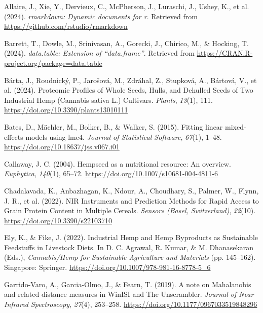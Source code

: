 \documentclass[
]{agujournal2019}
\newlength{\cslhangindent}
\newenvironment{CSLReferences}[2] %
 {\begin{list}{}{%
  \setlength{\itemindent}{0pt}
  \setlength{\leftmargin}{0pt}
  \setlength{\parsep}{0pt}
  \ifodd #1
   \setlength{\leftmargin}{\cslhangindent}
   \setlength{\itemindent}{-1\cslhangindent}
  \fi
  \setlength{\itemsep}{#2\baselineskip}}}
 {\end{list}}
\begin{document}
\label{refs}
\begin{CSLReferences}{1}{0}
\vspace{1em}

Allaire, J., Xie, Y., Dervieux, C., McPherson, J., Luraschi, J., Ushey,
K., et al. (2024). \emph{{rmarkdown}: Dynamic documents for r}.
Retrieved from \url{https://github.com/rstudio/rmarkdown}

Barrett, T., Dowle, M., Srinivasan, A., Gorecki, J., Chirico, M., \&
Hocking, T. (2024). \emph{{data.table}: Extension of
{``{data.frame}''}}. Retrieved from
\url{https://CRAN.R-project.org/package=data.table}

Bárta, J., Roudnický, P., Jarošová, M., Zdráhal, Z., Stupková, A.,
Bártová, V., et al. (2024). Proteomic {Profiles} of {Whole} {Seeds},
{Hulls}, and {Dehulled} {Seeds} of {Two} {Industrial} {Hemp} ({Cannabis}
sativa {L}.) {Cultivars}. \emph{Plants}, \emph{13}(1), 111.
\url{https://doi.org/10.3390/plants13010111}

Bates, D., Mächler, M., Bolker, B., \& Walker, S. (2015). Fitting linear
mixed-effects models using {lme4}. \emph{Journal of Statistical
Software}, \emph{67}(1), 1--48.
\url{https://doi.org/10.18637/jss.v067.i01}

Callaway, J. C. (2004). Hempseed as a nutritional resource: An overview.
\emph{Euphytica}, \emph{140}(1), 65--72.
\url{https://doi.org/10.1007/s10681-004-4811-6}

Chadalavada, K., Anbazhagan, K., Ndour, A., Choudhary, S., Palmer, W.,
Flynn, J. R., et al. (2022). {NIR} {Instruments} and {Prediction}
{Methods} for {Rapid} {Access} to {Grain} {Protein} {Content} in
{Multiple} {Cereals}. \emph{Sensors (Basel, Switzerland)},
\emph{22}(10). \url{https://doi.org/10.3390/s22103710}

Ely, K., \& Fike, J. (2022). Industrial {Hemp} and {Hemp} {Byproducts}
as {Sustainable} {Feedstuffs} in {Livestock} {Diets}. In D. C. Agrawal,
R. Kumar, \& M. Dhanasekaran (Eds.), \emph{Cannabis/{Hemp} for
{Sustainable} {Agriculture} and {Materials}} (pp. 145--162). Singapore:
Springer. \url{https://doi.org/10.1007/978-981-16-8778-5_6}

Garrido-Varo, A., Garcia-Olmo, J., \& Fearn, T. (2019). A note on
{Mahalanobis} and related distance measures in {WinISI} and {The}
{Unscrambler}. \emph{Journal of Near Infrared Spectroscopy},
\emph{27}(4), 253--258. \url{https://doi.org/10.1177/0967033519848296}


\end{CSLReferences}
\end{document}
